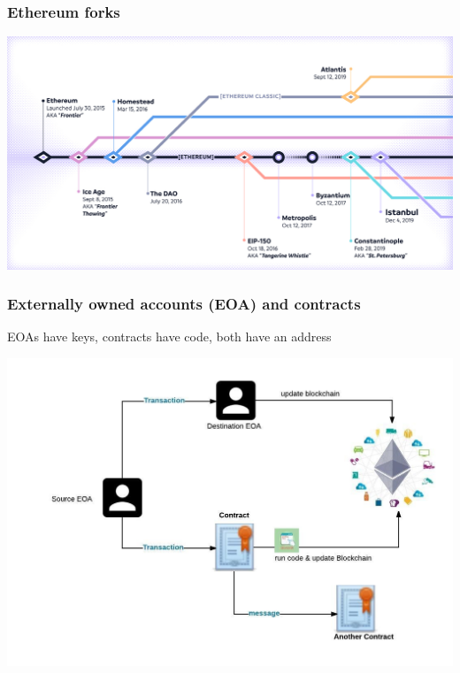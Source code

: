 \documentclass[11pt]{beamer}  %
\begin{document}
\begin{frame}\frametitle{Ethereum forks}

  \begin{center}
    \includegraphics[width=\textwidth,clip=false]{pictures/ethereum-forks.jpg}
  \end{center}

\end{frame}

\begin{frame}\frametitle{Externally owned accounts (EOA) and contracts}

  \begin{greenbox}{}
    EOAs have keys, contracts have code, both have an address
  \end{greenbox}
  
  \begin{center}
    \includegraphics[scale=0.35,clip=false]{pictures/eoa-contract.jpg}
  \end{center}

\end{frame}
\end{document}
